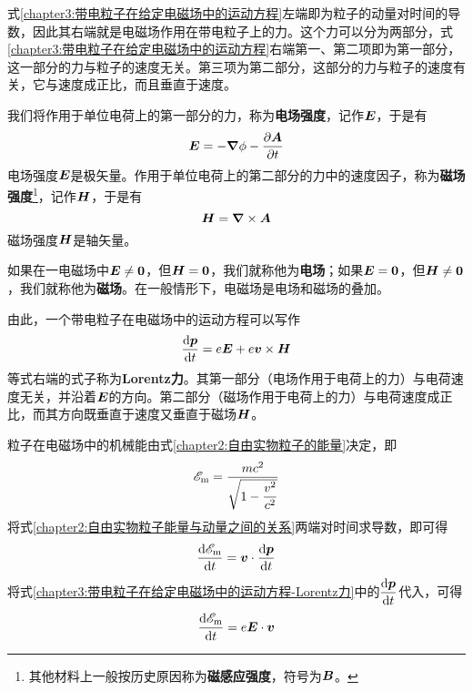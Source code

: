 式\eqref{chapter3:带电粒子在给定电磁场中的运动方程}左端即为粒子的动量对时间的导数，因此其右端就是电磁场作用在带电粒子上的力。这个力可以分为两部分，式\eqref{chapter3:带电粒子在给定电磁场中的运动方程}右端第一、第二项即为第一部分，这一部分的力与粒子的速度无关。第三项为第二部分，这部分的力与粒子的速度有关，它与速度成正比，而且垂直于速度。

我们将作用于单位电荷上的第一部分的力，称为{\bf 电场强度}，记作$\boldsymbol{E}$，于是有
\begin{equation}
	\boldsymbol{E} = -\boldsymbol{\nabla} \phi- \frac{\partial \boldsymbol{A}}{\partial t}
	\label{chapter3:电场强度的定义}
\end{equation}
电场强度$\boldsymbol{E}$是极矢量。作用于单位电荷上的第二部分的力中的速度因子，称为{\bf 磁场强度}\footnote{其他材料上一般按历史原因称为{\bf 磁感应强度}，符号为$\boldsymbol{B}$。}，记作$\boldsymbol{H}$，于是有
\begin{equation}
	\boldsymbol{H} = \boldsymbol{\nabla} \times \boldsymbol{A}
	\label{chapter3:磁场强度的定义}
\end{equation}
磁场强度$\boldsymbol{H}$是轴矢量。

如果在一电磁场中$\boldsymbol{E}\neq \boldsymbol{0}$，但$\boldsymbol{H}=\boldsymbol{0}$，我们就称他为{\bf 电场}；如果$\boldsymbol{E}= \boldsymbol{0}$，但$\boldsymbol{H}\neq \boldsymbol{0}$，我们就称他为{\bf 磁场}。在一般情形下，电磁场是电场和磁场的叠加。

由此，一个带电粒子在电磁场中的运动方程可以写作
\begin{equation}
	\frac{\mathrm{d} \boldsymbol{p}}{\mathrm{d} t} = e\boldsymbol{E}+e\boldsymbol{v}\times \boldsymbol{H}
	\label{chapter3:带电粒子在给定电磁场中的运动方程-Lorentz力}
\end{equation}
等式右端的式子称为{\bf Lorentz力}。其第一部分（电场作用于电荷上的力）与电荷速度无关，并沿着$\boldsymbol{E}$的方向。第二部分（磁场作用于电荷上的力）与电荷速度成正比，而其方向既垂直于速度又垂直于磁场$\boldsymbol{H}$。

粒子在电磁场中的机械能由式\eqref{chapter2:自由实物粒子的能量}决定，即
\begin{equation*}
	\mathscr{E}_{\text{m}} = \frac{mc^2}{\sqrt{1-\dfrac{v^2}{c^2}}}
\end{equation*}
将式\eqref{chapter2:自由实物粒子能量与动量之间的关系}两端对时间求导数，即可得
\begin{equation*}
	\frac{\mathrm{d} \mathscr{E}_{\text{m}}}{\mathrm{d} t} = \boldsymbol{v}\cdot \frac{\mathrm{d} \boldsymbol{p}}{\mathrm{d} t}
\end{equation*}
将式\eqref{chapter3:带电粒子在给定电磁场中的运动方程-Lorentz力}中的$\dfrac{\mathrm{d} \boldsymbol{p}}{\mathrm{d} t}$代入，可得
\begin{equation}
	\frac{\mathrm{d} \mathscr{E}_{\text{m}}}{\mathrm{d} t} = e\boldsymbol{E}\cdot \boldsymbol{v}
	\label{chapter3:电磁场中带电粒子能量的变化}
\end{equation}

